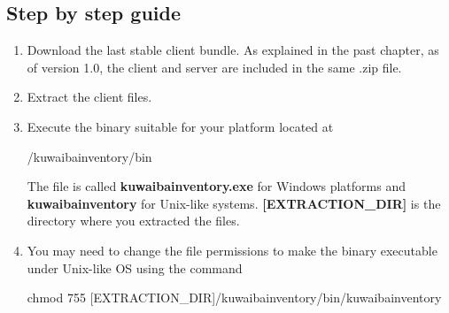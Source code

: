 \documentclass[a4paper]{article}
\begin{document}
				\subsection{Step by step guide}
					\begin{enumerate}
						\item Download the last stable client bundle. As explained in the past chapter, as of version 1.0, the client and server are included in the same .zip file.
						\item Extract the client files.
						\item Execute the binary suitable for your platform located at
						\begin{verbbox}
							/kuwaibainventory/bin
						\end{verbbox}
						\begin{figure}[ht]
							\centering	
							\theverbbox
						\end{figure}
						The file is called \textbf{kuwaibainventory.exe} for Windows platforms and \textbf{kuwaibainventory} for Unix-like systems. \textbf{[EXTRACTION\_DIR]} is the directory where you extracted the files.
						\item You may need to change the file permissions to make the binary executable under Unix-like OS using the command
						\begin{verbbox}
							chmod 755 [EXTRACTION_DIR]/kuwaibainventory/bin/kuwaibainventory
						\end{verbbox}
						\begin{figure}[ht]
							\centering	
							\theverbbox
						\end{figure}	
						
					\end{enumerate}
		\newpage
\end{document}
